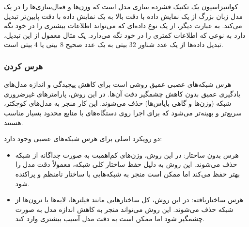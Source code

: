 کوانتیزاسیون یک تکنیک فشرده سازی مدل است که وزن‌ها و فعال‌سازی‌ها را در یک مدل زبان بزرگ از یک نمایش داده با دقت بالا به یک نمایش داده با دقت پایین‌تر تبدیل می‌کند. به عبارت دیگر، از یک نوع داده‌ای که می‌تواند اطلاعات بیشتری را در خود نگه دارد به نوعی که اطلاعات کمتری را در خود نگه می‌دارد. یک مثال معمول از این تبدیل، تبدیل داده‌ها از یک عدد شناور 32 بیتی 
به یک عدد صحیح 8 بیتی
یا 4 بیتی
است.

\subsubsection{هرس کردن}
هرس شبکه‌های عصبی عمیق روشی است برای کاهش پیچیدگی و اندازه مدل‌های یادگیری عمیق بدون کاهش چشمگیر دقت آن‌ها. در این روش، پارامترهای غیرضروری شبکه (وزن‌ها و گاهی بایاس‌ها) حذف می‌شوند. این کار منجر به مدل‌های کوچکتر، سریع‌تر و بهینه‌تر می‌شود که برای اجرا روی دستگاه‌های با منابع محدود بسیار مناسب هستند.

دو رویکرد اصلی برای هرس شبکه‌های عصبی وجود دارد:
\begin{itemize}
	\item{
		هرس بدون ساختار: در این روش، وزن‌های کم‌اهمیت به صورت جداگانه از شبکه حذف می‌شوند. این روش به دلیل حفظ ساختار کلی شبکه، معمولاً دقت مدل را بهتر حفظ می‌کند اما ممکن است منجر به شبکه‌هایی با ساختار نامنظم و پراکنده شود.}
	\item{
		هرس ساختاریافته: در این روش، کل ساختارهایی مانند فیلترها، لایه‌ها یا نرون‌ها از شبکه حذف می‌شوند. این روش می‌تواند منجر به کاهش اندازه مدل به صورت چشمگیر شود اما ممکن است به دقت مدل آسیب بیشتری وارد کند. } 
\end{itemize}